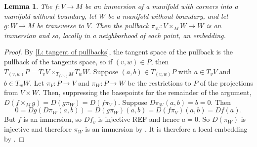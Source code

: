 \documentclass[12pt]{article}
\theoremstyle{plain}
\newtheorem{lemma}[theorem]{Lemma}
\theoremstyle{definition}
\theoremstyle{remark}
\begin{document}
\begin{lemma}
	The $f \colon V \to M$ be an immersion of a manifold with corners into a manifold without boundary, let $W$ be a manifold without boundary, and let $g \colon W \to M$ be transverse to $V$. 
	Then the pullback $\pi_W: V \times_M W \to W$ is an immersion and so, locally in a neighborhood of each point, an embedding.
\end{lemma}
\begin{proof}
	By \cref{L: tangent of pullbacks}, the tangent space of the pullback is the pullback of the tangents space, so if $(v,w) \in P$, then $T_{(v,w)}P = T_vV \times_{T_{f(v)}M} T_wW$. 
	Suppose $(a,b) \in T_{(v,w)}P$ with $a \in T_vV$ and $b \in T_wW$. 
	Let $\pi_V \colon P \to V$ and $\pi_W \colon P \to W$ be the restrictions to $P$ of the projections from $V \times W$.
	Then, suppressing the basepoints for the remainder of the argument, $D(f \times_M g) = D(g\pi_W) = D(f \pi_V)$.
	Suppose $D\pi_W(a,b)= b = 0$. 
	Then $$0 = Dg(D\pi_W(a,b))= D(g\pi_W)(a,b) = D(f \pi_V)(a,b) = Df(a).$$
	But $f$ is an immersion, so $Df_v$ is injective REF and hence $a=0$. 
	So $D(\pi_W)$ is injective and therefore $\pi_W$ is an immersion by \cite[Proposition 3.2.6]{MaDo92}.
	It is therefore a local embedding by \cite[Proposition 3.2.13]{MaDo92}.  
\end{proof}




\end{document}
